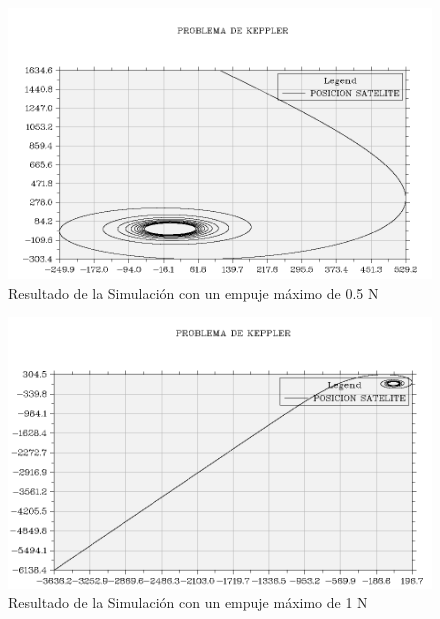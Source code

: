 \documentclass[11pt,singlespacing,liststotoc,headsepline,a4paper]{article}
\begin{document}
\begin{figure}[H]
	\centering
	\includegraphics[width=1\textwidth]{E05_100T.PNG}
	\caption{Resultado de la Simulación con un empuje máximo de 0.5 N}
	\label{E=0.5}
\end{figure}

\begin{figure}[H]
	\centering
	\includegraphics[width=1\textwidth]{E1_100T.PNG}
	\caption{Resultado de la Simulación con un empuje máximo de 1 N}
	\label{E=1}
\end{figure}
\end{document}
